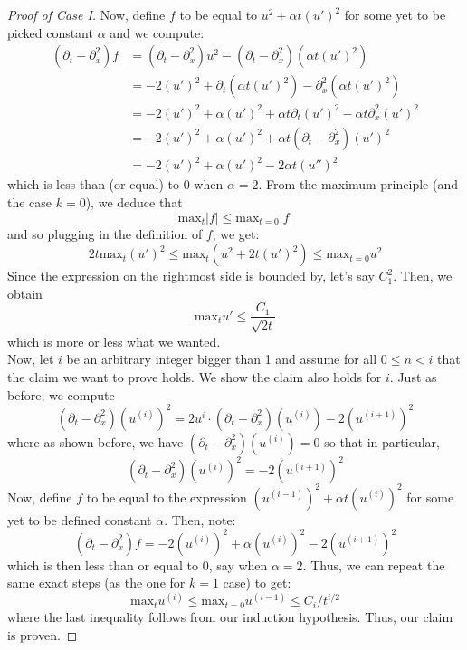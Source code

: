 \documentclass{article}
\begin{document}
\begin{proof}[Proof of Case I]
    Now, define $f$ to be equal to $u^2 + \alpha t (u')^2$ for some yet to be picked constant $\alpha$ and
    we compute:
    \begin{align*}
      (\partial_t - \partial_x^2) f &= (\partial_t - \partial_x^2) u^2 - (\partial_t - \partial_x^2) (\alpha t(u')^2) \\
        &= -2 (u')^2 + \partial_t (\alpha t (u')^2) - \partial_x^2 (\alpha t (u')^2) \\
        &= -2 (u')^2 + \alpha (u')^2 + \alpha t \partial_t (u')^2 - \alpha t\partial_x^2 (u')^2 \\
        &= -2 (u')^2 + \alpha (u')^2 + \alpha t (\partial_t - \partial_x^2) (u')^2 \\
        &= -2 (u')^2 + \alpha (u')^2 - 2\alpha t (u'')^2
    \end{align*}
    which is less than (or equal) to 0 when $\alpha = 2$. From the maximum principle (and the case $k=0$), we deduce that
    \[ \text{max}_t |f| \leq \text{max}_{t=0} |f| \]
    and so plugging in the definition of $f$, we get:
    \[ 2t\text{max}_t (u')^2 \leq \text{max}_t (u^2 + 2t(u')^2) \leq \text{max}_{t=0} u^2\]
    Since the expression on the rightmost side is bounded by, let's say $C_1^2$. Then, we obtain
    \[ \text{max}_t u' \leq \frac{C_1}{\sqrt{2t}} \]
    which is more or less what we wanted.\\

    Now, let $i$ be an arbitrary integer bigger than 1 and assume for all $0\leq n < i$ that the claim we want to prove
    holds. We show the claim also holds for $i$. Just as before, we compute
    \[ (\partial_t - \partial_x^2) (u^{(i)})^2 = 2u^i \cdot (\partial_t - \partial_x^2) (u^{(i)}) - 2(u^{(i+1)})^2 \]
    where as shown before, we have $(\partial_t - \partial_x^2) (u^{(i)}) = 0$ so that in particular,
    \[ (\partial_t - \partial_x^2) (u^{(i)})^2 = -2(u^{(i+1)})^2 \]
    Now, define $f$ to be equal to the expression $(u^{(i-1)})^2 + \alpha t (u^{(i)})^2$ for some yet to be defined
    constant $\alpha$. Then, note:
    \[ (\partial_t - \partial_x^2) f = -2(u^{(i)})^2 + \alpha (u^{(i)})^2 - 2(u^{(i+1)})^2 \]
    which is then less than or equal to 0, say when $\alpha = 2$. Thus, we can repeat the same exact steps (as the one for $k=1$ case)
    to get:
    \[ \text{max}_t u^{(i)} \leq \text{max}_{t=0} u^{(i-1)} \leq C_{i}/t^{i/2} \]
    where the last inequality follows from our induction hypothesis. Thus, our claim is proven.
\end{proof}
\end{document}
